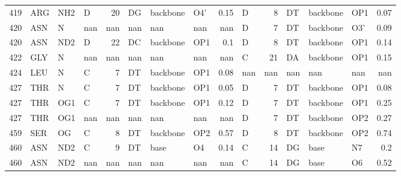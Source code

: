 \begin{longtable}{rlllrlllrlrlllr}
       419 & ARG        & NH2    & D         &          20 & DG           & backbone    & O4'      &          0.15 & D         &           8 & DT           & backbone    & OP1      &          0.07 \\
       420 & ASN        & N      & nan       &         nan & nan          & nan         & nan      &        nan    & D         &           7 & DT           & backbone    & O3'      &          0.09 \\
       420 & ASN        & ND2    & D         &          22 & DC           & backbone    & OP1      &          0.1  & D         &           8 & DT           & backbone    & OP1      &          0.14 \\
       422 & GLY        & N      & nan       &         nan & nan          & nan         & nan      &        nan    & C         &          21 & DA           & backbone    & OP1      &          0.15 \\
       424 & LEU        & N      & C         &           7 & DT           & backbone    & OP1      &          0.08 & nan       &         nan & nan          & nan         & nan      &        nan    \\
       427 & THR        & N      & C         &           7 & DT           & backbone    & OP1      &          0.05 & D         &           7 & DT           & backbone    & OP1      &          0.08 \\
       427 & THR        & OG1    & C         &           7 & DT           & backbone    & OP1      &          0.12 & D         &           7 & DT           & backbone    & OP1      &          0.25 \\
       427 & THR        & OG1    & nan       &         nan & nan          & nan         & nan      &        nan    & D         &           7 & DT           & backbone    & OP2      &          0.27 \\
       459 & SER        & OG     & C         &           8 & DT           & backbone    & OP2      &          0.57 & D         &           8 & DT           & backbone    & OP2      &          0.74 \\
       460 & ASN        & ND2    & C         &           9 & DT           & base        & O4       &          0.14 & C         &          14 & DG           & base        & N7       &          0.2  \\
       460 & ASN        & ND2    & nan       &         nan & nan          & nan         & nan      &        nan    & C         &          14 & DG           & base        & O6       &          0.52 \\

\end{longtable}
